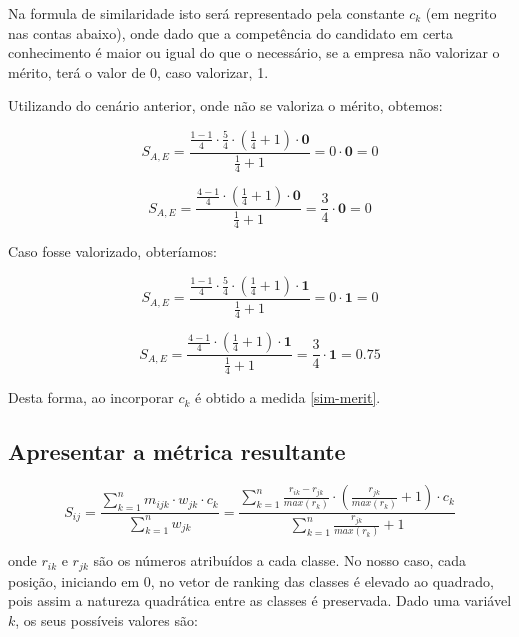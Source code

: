 \documentclass[preprint,12pt]{elsarticle}
\begin{document}
\begin{itemize}
    Na formula de similaridade isto será representado pela constante $c_{k}$ (em negrito nas contas abaixo), onde dado que a competência do candidato em certa conhecimento é maior ou igual do que o necessário, se a empresa não valorizar o mérito, terá o valor de 0, caso valorizar, 1.
    
    Utilizando do cenário anterior, onde não se valoriza o mérito, obtemos:
    
    $$ S_{A,E} = \frac{\tfrac{1 - 1}{4} \cdot \tfrac{5}{4} \cdot (\tfrac{1}{4} + 1) \cdot \textbf{0}}
                      {\tfrac{1}{4} + 1}
               = 0 \cdot \textbf{0} = 0 $$
    
    $$ S_{A,E} = \frac{\tfrac{4 - 1}{4} \cdot (\tfrac{1}{4} + 1) \cdot \textbf{0}}
                      {\tfrac{1}{4} + 1}
               = \frac{3}{4} \cdot \textbf{0} = 0 $$
    
    Caso fosse valorizado, obteríamos:
    
    $$ S_{A,E} = \frac{\tfrac{1 - 1}{4} \cdot \tfrac{5}{4} \cdot (\tfrac{1}{4} + 1) \cdot \textbf{1}}
                      {\tfrac{1}{4} + 1}
               = 0 \cdot \textbf{1} = 0 $$
    
    $$ S_{A,E} = \frac{\tfrac{4 - 1}{4} \cdot (\tfrac{1}{4} + 1) \cdot \textbf{1}}
                      {\tfrac{1}{4} + 1}
               = \frac{3}{4} \cdot \textbf{1} = 0.75 $$
               
    Desta forma, ao incorporar $c_{k}$ é obtido a medida \ref{sim-merit}.
\end{itemize}


\subsection{Apresentar a métrica resultante}

\begin{equation}
\label{sim-merit}
S_{ij} =  \frac{\sum_{k=1}^n m_{ijk} \cdot w_{jk} \cdot c_k}
               {\sum_{k=1}^n w_{jk}} =
          \frac{\sum_{k=1}^n \frac{r_{ik} - r_{jk}}{max(r_k)} \cdot (\frac{r_{jk}}{max(r_k)} + 1) \cdot c_{k}}
               {\sum_{k=1}^n {\frac{r_{jk}}{max(r_k)} + 1}}
\end{equation}

onde $r_{ik}$ e $r_{jk}$ são os números atribuídos a cada classe. No nosso caso, cada posição, iniciando em 0, no vetor de ranking das classes é elevado ao quadrado, pois assim a natureza quadrática entre as classes é preservada. Dado uma variável $k$, os seus possíveis valores são:
\end{document}
